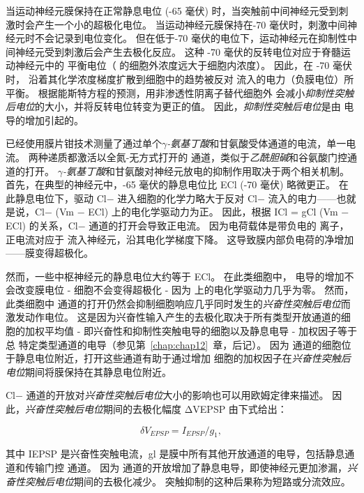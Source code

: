 当运动神经元膜保持在正常静息电位 (-65 毫伏) 时，当突触前中间神经元受到刺激时会产生一个小的超极化电位。
当运动神经元膜保持在-70 毫伏时，刺激中间神经元时不会记录到电位变化。
但在低于-70 毫伏的电位下，运动神经元在抑制性中间神经元受到刺激后会产生去极化反应。
这种 -70 毫伏的反转电位对应于脊髓运动神经元中的  平衡电位（ 的细胞外浓度远大于细胞内浓度）。
因此，在 -70 毫伏时， 沿着其化学浓度梯度扩散到细胞中的趋势被反对  流入的电力（负膜电位）所平衡。
根据能斯特方程的预测，用非渗透性阴离子替代细胞外  会减小\textit{抑制性突触后电位}的大小，并将反转电位转变为更正的值。
因此，\textit{抑制性突触后电位}是由  电导的增加引起的。


已经使用膜片钳技术测量了通过单个\textit{$\gamma$-氨基丁酸}和甘氨酸受体通道的电流，单一电流。
两种递质都激活以全氮-无方式打开的  通道，类似于\textit{乙酰胆碱}和谷氨酸门控通道的打开。
\textit{$\gamma$-氨基丁酸}和甘氨酸对神经元放电的抑制作用取决于两个相关机制。
首先，在典型的神经元中，-65 毫伏的静息电位比 ECl (-70 毫伏) 略微更正。
在此静息电位下，驱动 Cl− 进入细胞的化学力略大于反对 Cl− 流入的电力——也就是说，Cl− (Vm − ECl) 上的电化学驱动力为正。
因此，根据 ICl = gCl (Vm − ECl) 的关系，Cl− 通道的打开会导致正电流。 因为电荷载体是带负电的  离子，正电流对应于  流入神经元，沿其电化学梯度下降。
这导致膜内部负电荷的净增加——膜变得超极化。


然而，一些中枢神经元的静息电位大约等于 ECl。 在此类细胞中， 电导的增加不会改变膜电位 - 细胞不会变得超极化 - 因为  上的电化学驱动力几乎为零。
然而，此类细胞中  通道的打开仍然会抑制细胞响应几乎同时发生的\textit{兴奋性突触后电位}而激发动作电位。
这是因为兴奋性输入产生的去极化取决于所有类型开放通道的细胞的加权平均值 - 即兴奋性和抑制性突触电导的细胞以及静息电导 - 加权因子等于总 特定类型通道的电导（参见第~\ref{chap:chap12}~章，后记）。
因为  通道的细胞位于静息电位附近，打开这些通道有助于通过增加  细胞的加权因子在\textit{兴奋性突触后电位}期间将膜保持在其静息电位附近。


Cl− 通道的开放对\textit{兴奋性突触后电位}大小的影响也可以用欧姆定律来描述。
因此，\textit{兴奋性突触后电位}期间的去极化幅度 ΔVEPSP 由下式给出：


\begin{equation}\label{depolarization_amplitude}
	\delta V_{EPSP} = I_{EPSP} / g_1,
\end{equation}


其中 IEPSP 是兴奋性突触电流，gl 是膜中所有其他开放通道的电导，包括静息通道和传输门控  通道。 因为  通道的开放增加了静息电导，即使神经元更加渗漏，\textit{兴奋性突触后电位}期间的去极化减少。
突触抑制的这种后果称为短路或分流效应。


